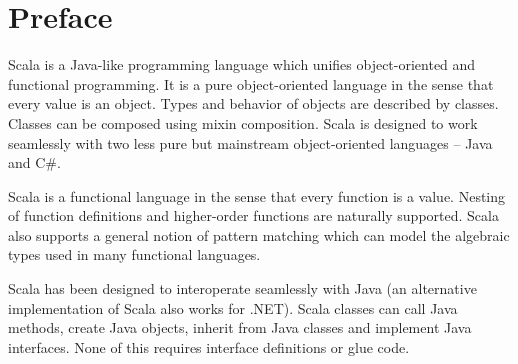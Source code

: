 
\renewcommand{\todo}[1]{}
\newcommand{\notyet}[1]{\footnote{#1 not yet implemented.}}
\newcommand{\Ps}{\mbox{\sl Ps}}
\newcommand{\Ts}{\mbox{\sl Ts}}
\newcommand{\tps}{\mbox{\sl tps}}
\newcommand{\ps}{\mbox{\sl ps}}
\newcommand{\ds}{\mbox{\sl ds}}
\newcommand{\xs}{\mbox{\sl xs}}
\newcommand{\psig}{\mbox{\sl psig}}
\newcommand{\fsig}{\mbox{\sl fsig}}
\newcommand{\csig}{\mbox{\sl csig}}
\newcommand{\args}{\mbox{\sl args}}
\newcommand{\targs}{\mbox{\sl targs}}
\newcommand{\ttcs}{\mbox{\sl ttcs}}
\newcommand{\complx}{\mbox{\sl complexity}}
\newcommand{\enums}{\mbox{\sl enums}}
\newcommand{\proto}{\mbox{\sl pt}}
\newcommand{\argtypes}{\mbox{\sl Ts}}
\newcommand{\stats}{\mbox{\sl stats}}
\newcommand{\overload}{\la\mbox{\sf and}\ra}
\newcommand{\op}{\mbox{\sl op}}

\newcommand{\eqdef}{\stackrel{\mbox{\small eq}}{=}}
\newcommand{\ifqualified}[1]{}
\newcommand{\iflet}[1]{}
\newcommand{\ifundefvar}[1]{}
\newcommand{\iffinaltype}[1]{}
\newcommand{\ifpackaging}[1]{}
\newcommand{\ifnewfor}[1]{}

\newcommand{\U}[1]{\mbox{$\backslash$u{#1}}}
\newcommand{\Urange}[2]{\mbox{$\backslash$u{#1}-$\backslash$u{#2}}}

\section*{Preface}


Scala is a Java-like programming language which unifies
object-oriented and functional programming.  It is a pure
object-oriented language in the sense that every value is an
object. Types and behavior of objects are described by
classes. Classes can be composed using mixin composition.  Scala is
designed to work seamlessly with two less pure but mainstream
object-oriented languages -- Java and C\#.

Scala is a functional language in the sense that every function is a
value. Nesting of function definitions and higher-order functions are
naturally supported. Scala also supports a general notion of pattern
matching which can model the algebraic types used in many functional
languages.

Scala has been designed to interoperate seamlessly with Java (an
alternative implementation of Scala also works for .NET). Scala
classes can call Java methods, create Java objects, inherit from Java
classes and implement Java interfaces. None of this requires interface
definitions or glue code.


